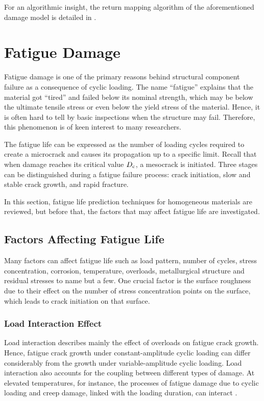 For an algorithmic insight, the return mapping algorithm of the aforementioned damage model is detailed in .




\section{Fatigue Damage}

Fatigue damage is one of the primary reasons behind structural component failure as a consequence of cyclic loading. The name ``fatigue'' explains that the material got ``tired'' and failed below its nominal strength, which may be below the ultimate tensile stress or even below the yield stress of the material. Hence, it is often hard to tell by basic inspections when the structure may fail. Therefore, this phenomenon is of keen interest to many researchers.

The fatigue life can be expressed as the number of loading cycles required to create a microcrack and causes its propagation up to a specific limit. Recall that when damage reaches its critical value $D_{\rm c}$, a mesocrack is initiated. Three stages can be distinguished during a fatigue failure process: crack initiation, slow and stable crack growth, and rapid fracture.

In this section, fatigue life prediction techniques for homogeneous materials are reviewed, but before that, the factors that may affect fatigue life are investigated.

\subsection{Factors Affecting Fatigue Life}
Many factors can affect fatigue life such as load pattern, number of cycles, stress concentration, corrosion, temperature, overloads, metallurgical structure and residual stresses to name but a few. One crucial factor is the surface roughness due to their effect on the number of stress concentration points on the surface, which leads to crack initiation on that surface.

\subsubsection{Load Interaction Effect}
Load interaction describes mainly the effect of overloads on fatigue crack growth. Hence, fatigue crack growth under constant-amplitude cyclic loading can differ considerably from the growth under variable-amplitude cyclic loading. Load interaction also accounts for the coupling between different types of damage. At elevated temperatures, for instance, the processes of fatigue damage due to cyclic loading and creep damage, linked with the loading duration, can interact \parencite{lemaitre1994mechanics}.

